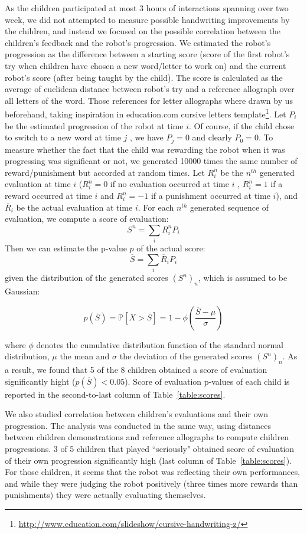 \documentclass{article}
\begin{document}
As the children participated at most 3 hours of interactions spanning over two
week, we did not attempted to measure possible handwriting improvements by the
children, and instead we focused on the possible correlation between the
children's feedback and the robot's progression.  We estimated the robot's
progression as the difference between a starting score (score of the first
robot's try when children have chosen a new word/letter to work on) and the
current robot's score (after being taught by the child). The score is calculated
as the average of euclidean distance between robot's try and a reference
allograph over all letters of the word. Those references for letter allographs
where drawn by us beforehand, taking inspiration in education.com cursive
letters
template\footnote{\url{http://www.education.com/slideshow/cursive-handwriting-z/}}.
Let $P_i$ be the estimated progression of the robot at time $ i$. Of course, if
the child chose to switch to a new word at time $ j$ , we have $ P_{j}=0$ and
clearly $ P_0=0$.  To measure whether the fact that the child was rewarding the
robot when it was progressing was significant or not, we generated 10000 times
the same number of reward/punishment but accorded at random times. Let $ R_i^n$
be the $n^{th}$ generated evaluation at time $ i$ ($ R_i^n = 0$ if no evaluation
occurred at time $ i$ , $ R_i^n=1$ if a reward occurred at time $i$ and
$R_i^n=-1$ if a punishment occurred at time $i$), and $\overline{R}_i$ be the
actual evaluation at time $i$. For each $n^{th}$ generated sequence of
evaluation, we compute a score of evaluation: $$ S^n = \sum\limits_i{R_i^n
P_i}$$ Then we can estimate the p-value $p$ of the actual score: $$ \overline{S}
= \sum\limits_i{\overline{R}_i P_i}$$ given the distribution of the generated
scores $\left(S^n\right)_n$, which is assumed to be Gaussian: 

$$
p(\overline{S})= \mathbb{P}{\left[X>\overline{S}\right]} = 1-\phi{\left(\frac{\overline{S}-\mu}{\sigma}\right)}
$$

where $\phi$ denotes the cumulative distribution function of the standard normal
distribution, $\mu$ the mean and $\sigma$ the deviation of the generated scores
$\left(S^n\right)_n$.  As a result, we found that 5 of the 8 children obtained a
score of evaluation significantly hight ($p(\overline{S})<0.05$). Score of
evaluation p-values of each child is reported in the second-to-last column of
Table~\ref{table:scores}.

We also studied correlation between children's evaluations and their own
progression. The analysis was conducted in the same way, using distances between
children demonstrations and reference allographs to compute children
progressions.  3 of 5 children that played ``seriously" obtained score of
evaluation of their own progression significantly high (last column of
Table~\ref{table:scores}). For those children, it seems that the robot was
reflecting their own performances, and while they were judging the robot
positively (three times more rewards than punishments) they were actually
evaluating themselves.
\end{document}
